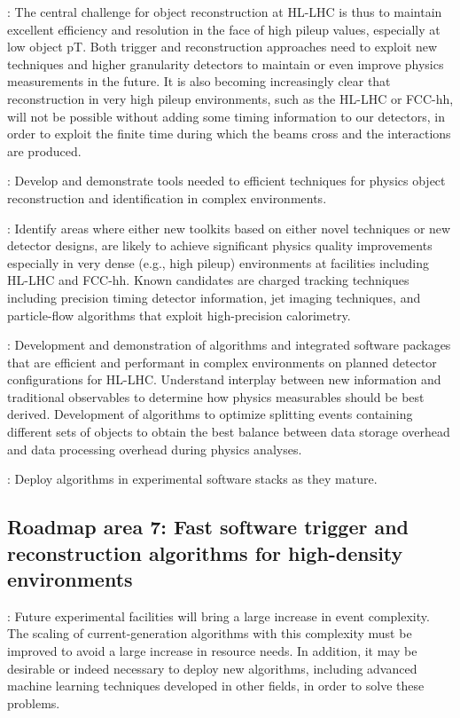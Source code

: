 : The central challenge for object reconstruction at HL-LHC is thus to maintain excellent efficiency and resolution in the face of high pileup values, especially at low object pT. Both trigger and reconstruction approaches need to exploit new techniques and higher granularity detectors to maintain or even improve physics measurements in the future.
It is also becoming increasingly clear that reconstruction in very high pileup environments, such as the HL-LHC or FCC-hh, will not be possible without adding some timing information to our detectors, in order to exploit the finite time during which the beams cross and the interactions are produced.

\vskip 0.5cm
: Develop and demonstrate tools needed to efficient techniques for physics object reconstruction and identification in complex environments.

\vskip 0.5cm
: Identify areas where either new toolkits based on either novel techniques or new detector designs, are likely to achieve significant physics quality improvements especially in very dense (e.g., high pileup) environments at facilities including HL-LHC and FCC-hh. Known candidates are charged tracking techniques including precision timing detector information, jet imaging techniques, and particle-flow algorithms that exploit high-precision calorimetry. 
 
\vskip 0.5cm
: Development and demonstration of algorithms and integrated software packages that are efficient and performant in complex environments on planned detector configurations for HL-LHC. Understand interplay between new information and traditional observables to determine how physics measurables should be best derived. Development of algorithms to optimize splitting events containing different sets of objects to obtain the best balance between data storage overhead and data processing overhead during physics analyses.

\vskip 0.5cm
: Deploy algorithms in experimental software stacks as they mature.

\subsection{Roadmap area 7: Fast software trigger and reconstruction algorithms for high-density environments}

: Future experimental facilities will bring a large increase in event complexity. The scaling of current-generation algorithms with this complexity must be improved to avoid a large increase in resource needs. In addition, it may be desirable or indeed necessary to deploy new algorithms, including advanced machine learning techniques developed in other fields, in order to solve these problems.

